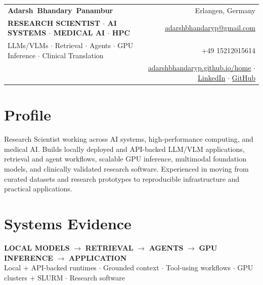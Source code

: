 \documentclass[10pt,a4paper]{article}
\begin{document}
\begin{tabularx}{\textwidth}{@{}Xr@{}}
  {\fontsize{21}{23}\selectfont\bfseries\mbox{Adarsh Bhandary Panambur}} & \textcolor{muted}{Erlangen, Germany}\\
  {\small\color{accent}\bfseries RESEARCH SCIENTIST $\cdot$ AI SYSTEMS $\cdot$ MEDICAL AI $\cdot$ HPC} & \href{mailto:adarshbhandaryp@gmail.com}{adarshbhandaryp@gmail.com}\\
  {\small\textcolor{muted}{LLMs/VLMs $\cdot$ Retrieval $\cdot$ Agents $\cdot$ GPU Inference $\cdot$ Clinical Translation}} & +49 15212015614\\
  & \href{https://adarshbhandaryp.github.io/home/}{adarshbhandaryp.github.io/home} $\cdot$ \href{https://linkedin.com/in/adarshbhandaryp}{LinkedIn} $\cdot$ \href{https://github.com/adarshbhandaryp}{GitHub}
\end{tabularx}

\section{Profile}
Research Scientist working across AI systems, high-performance computing, and medical AI. Builds locally deployed and API-backed LLM/VLM applications, retrieval and agent workflows, scalable GPU inference, multimodal foundation models, and clinically validated research software. Experienced in moving from curated datasets and research prototypes to reproducible infrastructure and practical applications.

\section{Systems Evidence}
\colorbox{panel}{\parbox{\dimexpr\textwidth-2\fboxsep-2pt}{\vspace{2pt}\centering
\textbf{LOCAL MODELS}\; $\rightarrow$ \;\textbf{RETRIEVAL}\; $\rightarrow$ \;\textbf{AGENTS}\; $\rightarrow$ \;\textbf{GPU INFERENCE}\; $\rightarrow$ \;\textbf{APPLICATION}\\[2pt]
\footnotesize Local + API-backed runtimes $\cdot$ Grounded context $\cdot$ Tool-using workflows $\cdot$ GPU clusters + SLURM $\cdot$ Research software\vspace{2pt}}}
\end{document}
